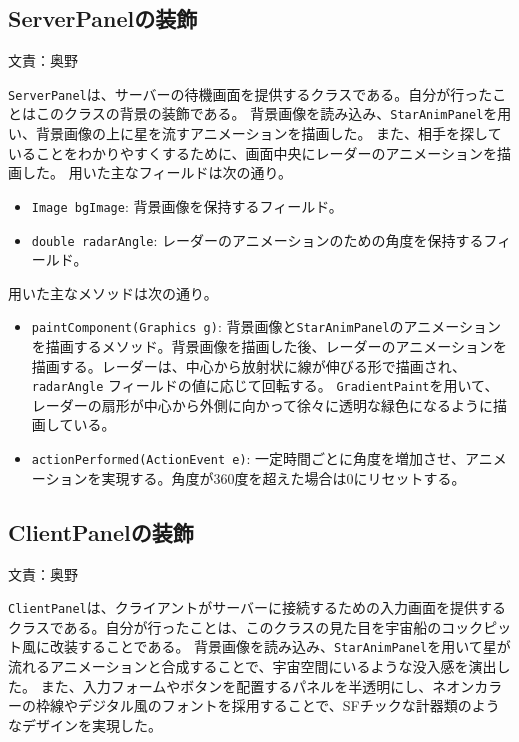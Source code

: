 \documentclass[11pt,a4j]{jarticle}
\begin{document}
\subsection{ServerPanelの装飾}
\begin{flushright}
  文責：奥野
\end{flushright}
\noindent \texttt{ServerPanel}は、サーバーの待機画面を提供するクラスである。自分が行ったことはこのクラスの背景の装飾である。
背景画像を読み込み、\texttt{StarAnimPanel}を用い、背景画像の上に星を流すアニメーションを描画した。
また、相手を探していることをわかりやすくするために、画面中央にレーダーのアニメーションを描画した。
用いた主なフィールドは次の通り。
\begin{itemize}
    \item \texttt{Image bgImage}: 背景画像を保持するフィールド。
    \item \texttt{double radarAngle}: レーダーのアニメーションのための角度を保持するフィールド。
\end{itemize}

用いた主なメソッドは次の通り。
\begin{itemize}
    \item \texttt{paintComponent(Graphics g)}: 背景画像と\texttt{StarAnimPanel}のアニメーションを描画するメソッド。背景画像を描画した後、レーダーのアニメーションを描画する。レーダーは、中心から放射状に線が伸びる形で描画され、\texttt{radarAngle} フィールドの値に応じて回転する。
    \texttt{GradientPaint}を用いて、レーダーの扇形が中心から外側に向かって徐々に透明な緑色になるように描画している。
    \item \texttt{actionPerformed(ActionEvent e)}: 一定時間ごとに角度を増加させ、アニメーションを実現する。角度が360度を超えた場合は0にリセットする。
\end{itemize}

\subsection{ClientPanelの装飾}
\begin{flushright}
  文責：奥野
\end{flushright}
\noindent \texttt{ClientPanel}は、クライアントがサーバーに接続するための入力画面を提供するクラスである。自分が行ったことは、このクラスの見た目を宇宙船のコックピット風に改装することである。
背景画像を読み込み、\texttt{StarAnimPanel}を用いて星が流れるアニメーションと合成することで、宇宙空間にいるような没入感を演出した。
また、入力フォームやボタンを配置するパネルを半透明にし、ネオンカラーの枠線やデジタル風のフォントを採用することで、SFチックな計器類のようなデザインを実現した。
\end{document}
